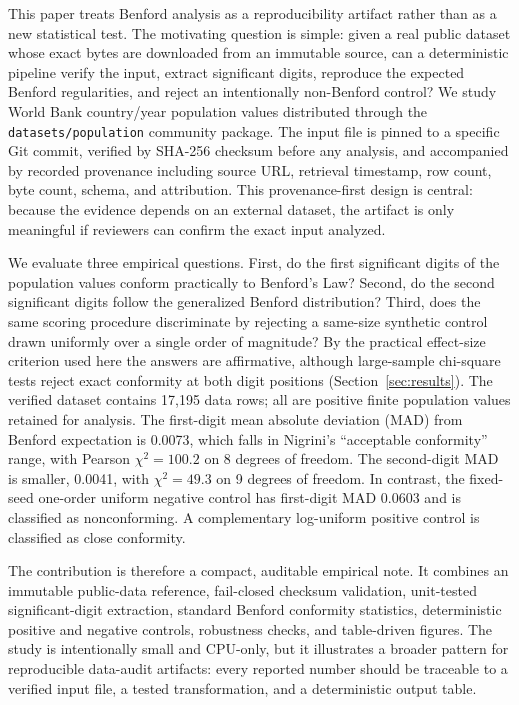\documentclass[sigconf,nonacm]{acmart}
\begin{document}
This paper treats Benford analysis as a reproducibility artifact rather than as a new statistical test. The motivating question is simple: given a real public dataset whose exact bytes are downloaded from an immutable source, can a deterministic pipeline verify the input, extract significant digits, reproduce the expected Benford regularities, and reject an intentionally non-Benford control? We study World Bank country/year population values distributed through the \texttt{datasets/population} community package. The input file is pinned to a specific Git commit, verified by SHA-256 checksum before any analysis, and accompanied by recorded provenance including source URL, retrieval timestamp, row count, byte count, schema, and attribution. This provenance-first design is central: because the evidence depends on an external dataset, the artifact is only meaningful if reviewers can confirm the exact input analyzed.

We evaluate three empirical questions. First, do the first significant digits of the population values conform practically to Benford's Law? Second, do the second significant digits follow the generalized Benford distribution? Third, does the same scoring procedure discriminate by rejecting a same-size synthetic control drawn uniformly over a single order of magnitude? By the practical effect-size criterion used here the answers are affirmative, although large-sample chi-square tests reject exact conformity at both digit positions (Section~\ref{sec:results}). The verified dataset contains 17,195 data rows; all are positive finite population values retained for analysis. The first-digit mean absolute deviation (MAD) from Benford expectation is 0.0073, which falls in Nigrini's ``acceptable conformity'' range, with Pearson \(\chi^2=100.2\) on 8 degrees of freedom. The second-digit MAD is smaller, 0.0041, with \(\chi^2=49.3\) on 9 degrees of freedom. In contrast, the fixed-seed one-order uniform negative control has first-digit MAD 0.0603 and is classified as nonconforming. A complementary log-uniform positive control is classified as close conformity.

The contribution is therefore a compact, auditable empirical note. It combines an immutable public-data reference, fail-closed checksum validation, unit-tested significant-digit extraction, standard Benford conformity statistics, deterministic positive and negative controls, robustness checks, and table-driven figures. The study is intentionally small and CPU-only, but it illustrates a broader pattern for reproducible data-audit artifacts: every reported number should be traceable to a verified input file, a tested transformation, and a deterministic output table.
\end{document}
